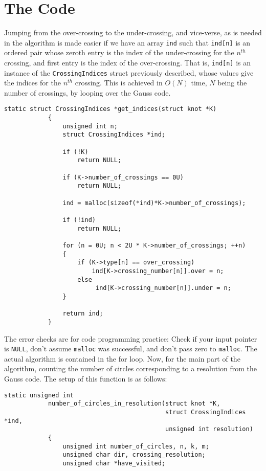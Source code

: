 \documentclass{article}
\theoremstyle{plain}
\begin{document}
    \section{The Code}
        Jumping from the over-crossing to the under-crossing, and vice-verse,
        as is needed in the algorithm is made easier if we have an array
        \texttt{ind} such that \texttt{ind[n]} is an ordered pair whose
        zeroth entry is the index of the under-crossing for the $n^{th}$
        crossing, and first entry is the index of the over-crossing. That is,
        \texttt{ind[n]} is an instance of the
        \texttt{CrossingIndices} struct previously described, whose values
        give the indices for the $n^{th}$ crossing. This is achieved in
        $O(N)$ time, $N$ being the number of crossings, by looping over the
        Gauss code.
        \begin{lstlisting}[style=CStyle, gobble=12]
            static struct CrossingIndices *get_indices(struct knot *K)
            {
                unsigned int n;
                struct CrossingIndices *ind;

                if (!K)
                    return NULL;

                if (K->number_of_crossings == 0U)
                    return NULL;

                ind = malloc(sizeof(*ind)*K->number_of_crossings);

                if (!ind)
                    return NULL;

                for (n = 0U; n < 2U * K->number_of_crossings; ++n)
                {
                    if (K->type[n] == over_crossing)
                        ind[K->crossing_number[n]].over = n;
                    else
                         ind[K->crossing_number[n]].under = n;
                }

                return ind;
            }
        \end{lstlisting}
        The error checks are for code programming practice: Check if your
        input pointer is \texttt{NULL}, don't assume \texttt{malloc} was
        successful, and don't pass zero to \texttt{malloc}. The actual algorithm
        is contained in the for loop.
        \newpage
        Now, for the main part of the algorithm, counting the number of circles
        corresponding to a resolution from the Gauss code.
        The setup of this function is as follows:
        \begin{lstlisting}[style=CStyle, gobble=12]
        static unsigned int
            number_of_circles_in_resolution(struct knot *K,
                                            struct CrossingIndices *ind,
                                            unsigned int resolution)
            {
                unsigned int number_of_circles, n, k, m;
                unsigned char dir, crossing_resolution;
                unsigned char *have_visited;
        \end{lstlisting}
\end{document}
